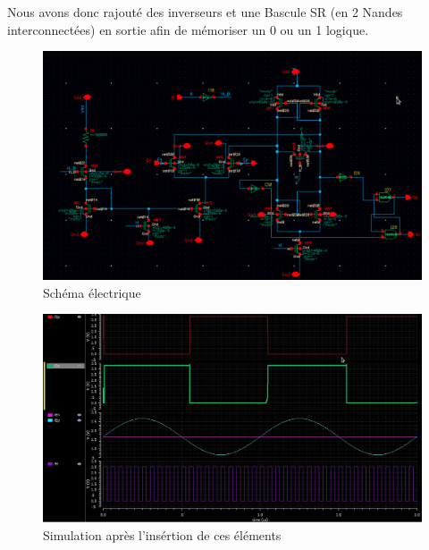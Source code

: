 \documentclass[11pt]{article}
\begin{document}
Nous avons donc rajout\'e des inverseurs et une Bascule SR (en 2 Nandes interconnect\'ees) en sortie afin de m\'emoriser
un 0 ou un 1 logique.

\begin{figure}[!htb]
      \centering
      \includegraphics[width=0.9\linewidth]{comparateur_schema_cadence_SR.png}
      \caption{Sch\'ema \'electrique}
      \label{fig:schcompSR}
\end{figure}%

\begin{figure}[!htb]
      \centering
      \includegraphics[width=\linewidth]{sim_comp_after_SR_FF.jpg}
      \caption{Simulation apr\`es l'ins\'ertion de ces \'el\'ements}
      \label{fig:sfigASRFF}
\end{figure}%
\end{document}
